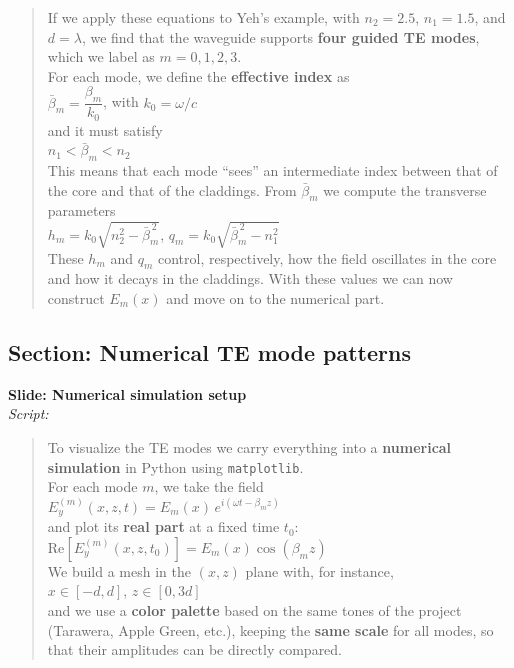 \documentclass{article}
\begin{document}
\begin{quote}
If we apply these equations to Yeh’s example, with \(n_2 = 2.5\), \(n_1 = 1.5\), and \(d = \lambda\), 
we find that the waveguide supports \textbf{four guided TE modes}, which we label as 
\(m = 0,1,2,3\).\\[2mm]
For each mode, we define the \textbf{effective index} as\\[1mm]
\(\bar{\beta}_m = \dfrac{\beta_m}{k_0}\), \quad with \(k_0 = \omega/c\)\\[2mm]
and it must satisfy\\[1mm]
\(n_1 < \bar{\beta}_m < n_2\)\\[2mm]
This means that each mode “sees” an intermediate index between that of the core and that of the 
claddings. From \(\bar{\beta}_m\) we compute the transverse parameters\\[1mm]
\(h_m = k_0\sqrt{n_2^{2} - \bar{\beta}_m^{\,2}}\), \quad
\(q_m = k_0\sqrt{\bar{\beta}_m^{\,2} - n_1^{2}}\)\\[2mm]
These \(h_m\) and \(q_m\) control, respectively, how the field oscillates in the core and how it 
decays in the claddings. With these values we can now construct \(E_m(x)\) and move on to the 
numerical part.
\end{quote}

\vspace{0.8cm}

\subsection*{Section: Numerical TE mode patterns}

\noindent
\textbf{Slide: Numerical simulation setup}\\[2mm]
\textit{Script:}\\[2mm]

\begin{quote}
To visualize the TE modes we carry everything into a \textbf{numerical simulation} in Python using 
\texttt{matplotlib}.\\[2mm]
For each mode \(m\), we take the field\\[1mm]
\(E_y^{(m)}(x,z,t) = E_m(x)\,e^{i(\omega t - \beta_m z)}\)\\[2mm]
and plot its \textbf{real part} at a fixed time \(t_0\):\\[1mm]
\(\text{Re}[E_y^{(m)}(x,z,t_0)] = E_m(x)\cos(\beta_m z)\)\\[2mm]
We build a mesh in the \((x,z)\) plane with, for instance,\\[1mm]
\(x \in [-d,d]\), \quad \(z \in [0,3d]\)\\[2mm]
and we use a \textbf{color palette} based on the same tones of the project 
(Tarawera, Apple Green, etc.), keeping the \textbf{same scale} for all modes, 
so that their amplitudes can be directly compared.
\end{quote}
\end{document}

